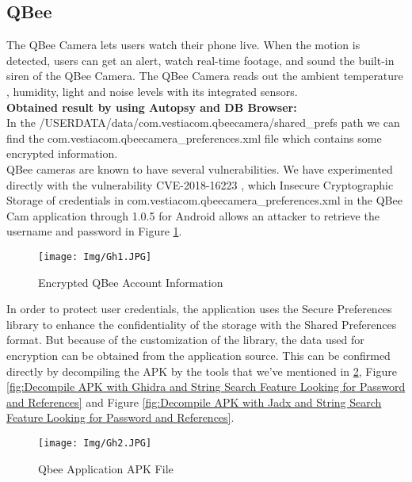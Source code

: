 \documentclass{easychair}
\begin{document}
\subsection{QBee}
The QBee Camera lets users watch their phone live. When the motion is detected, users can get an alert, watch real-time footage, and sound the built-in siren of the QBee Camera. The QBee Camera reads out the ambient temperature , humidity, light and noise levels with its integrated sensors. \cite{pari_6}\\

\textbf{Obtained result by using Autopsy and DB Browser:}\\

In the /USERDATA/data/com.vestiacom.qbeecamera/shared\_prefs path we can find the com.vestiacom.qbeecamera\_preferences.xml file which contains some encrypted information.\\

QBee cameras are known to have several vulnerabilities. We have experimented directly with the vulnerability CVE-2018-16223 \cite{Gh_6}, which Insecure Cryptographic Storage of credentials in com.vestiacom.qbeecamera\_preferences.xml in the QBee Cam application through 1.0.5 for Android allows an attacker to retrieve the username and password in Figure \ref{fig:Encrypted QBee Account Information}.
\begin{figure}[H]
    \centering
    \texttt{[image: Img/Gh1.JPG]}
    \caption{Encrypted QBee Account Information}
    \label{fig:Encrypted QBee Account Information}
\end{figure}

In order to protect user credentials, the application uses the Secure Preferences library to enhance the confidentiality of the storage with the Shared Preferences format. But because of the customization of the library, the data used for encryption can be obtained from the application source. This can be confirmed directly by decompiling the APK by the tools that we’ve mentioned in \ref{fig:Qbee Application APK File}, Figure \ref{fig:Decompile APK with Ghidra and String Search Feature Looking for Password and References} and Figure \ref{fig:Decompile APK with Jadx and String Search Feature Looking for Password and References}.

\begin{figure}[H]
    \centering
    \texttt{[image: Img/Gh2.JPG]}
    \caption{Qbee Application APK File}
    \label{fig:Qbee Application APK File}
\end{figure}
\end{document}
